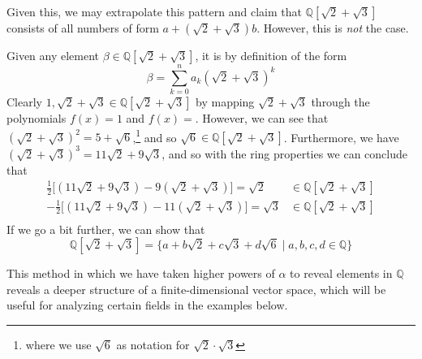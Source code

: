   Given this, we may extrapolate this pattern and claim that $\mathbb{Q}[\sqrt{2} + \sqrt{3}]$ consists of all numbers of form $a + (\sqrt{2} + \sqrt{3}) b$. However, this is \textit{not} the case. 

  \begin{example}
    Given any element $\beta \in \mathbb{Q}[\sqrt{2} + \sqrt{3}]$, it is by definition of the form 
    \begin{equation}
      \beta = \sum_{k=0}^n a_k (\sqrt{2} + \sqrt{3})^k 
    \end{equation} 
    Clearly $1, \sqrt{2} + \sqrt{3} \in \mathbb{Q}[\sqrt{2} + \sqrt{3}]$ by mapping $\sqrt{2} + \sqrt{3}$ through the polynomials $f(x) = 1$ and $f(x) = $. However, we can see that $(\sqrt{2} + \sqrt{3})^2 = 5 + \sqrt{6}$,\footnote{where we use $\sqrt{6}$ as notation for $\sqrt{2} \cdot \sqrt{3}$} and so $\sqrt{6} \in \mathbb{Q}[\sqrt{2} + \sqrt{3}]$. Furthermore, we have $(\sqrt{2} + \sqrt{3})^3 = 11 \sqrt{2} + 9 \sqrt{3}$, and so with the ring properties we can conclude that 
    \begin{align}
      \frac{1}{2} \big[ (11 \sqrt{2} + 9 \sqrt{3}) - 9 (\sqrt{2} + \sqrt{3})\big] = \sqrt{2} & \in \mathbb{Q}[\sqrt{2} + \sqrt{3}] \\
      -\frac{1}{2} \big[ (11 \sqrt{2} + 9 \sqrt{3}) - 11 (\sqrt{2} + \sqrt{3})\big] = \sqrt{3} & \in \mathbb{Q}[\sqrt{2} + \sqrt{3}] \\
    \end{align} 
    If we go a bit further, we can show that 
    \begin{equation}
      \mathbb{Q}[\sqrt{2} + \sqrt{3}] = \{a + b \sqrt{2} + c \sqrt{3} + d\sqrt{6} \mid a, b, c, d \in \mathbb{Q} \}
    \end{equation}
  \end{example}

  This method in which we have taken higher powers of $\alpha$ to reveal elements in $\mathbb{Q}$ reveals a deeper structure of a finite-dimensional vector space, which will be useful for analyzing certain fields in the examples below. 

